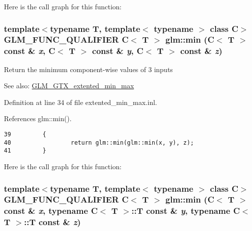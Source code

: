 Here is the call graph for this function:\hypertarget{group__gtx__extented__min__max_g50d031fb07c48e0626d12bf891df996d}{
\subsubsection[min]{\setlength{\rightskip}{0pt plus 5cm}template$<$typename T, template$<$ typename $>$ class C$>$ GLM\_\-FUNC\_\-QUALIFIER C$<$ T $>$ glm::min (C$<$ T $>$ const \& {\em x}, \/  C$<$ T $>$ const \& {\em y}, \/  C$<$ T $>$ const \& {\em z})}}
\label{group__gtx__extented__min__max_g50d031fb07c48e0626d12bf891df996d}


Return the minimum component-wise values of 3 inputs \begin{Desc}
\item[See also:]\hyperlink{group__gtx__extented__min__max}{GLM\_\-GTX\_\-extented\_\-min\_\-max} \end{Desc}


Definition at line 34 of file extented\_\-min\_\-max.inl.

References glm::min().

\begin{Code}\begin{verbatim}39         {
40                 return glm::min(glm::min(x, y), z);
41         }
\end{verbatim}
\end{Code}




Here is the call graph for this function:\hypertarget{group__gtx__extented__min__max_gd88885e3f9bbaeab162e9ea22db68858}{
\subsubsection[min]{\setlength{\rightskip}{0pt plus 5cm}template$<$typename T, template$<$ typename $>$ class C$>$ GLM\_\-FUNC\_\-QUALIFIER C$<$ T $>$ glm::min (C$<$ T $>$ const \& {\em x}, \/  typename C$<$ T $>$::T const \& {\em y}, \/  typename C$<$ T $>$::T const \& {\em z})}}
\label{group__gtx__extented__min__max_gd88885e3f9bbaeab162e9ea22db68858}


